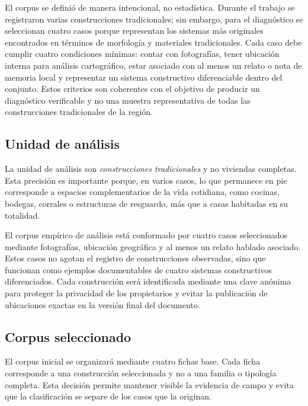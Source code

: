 El corpus se definió de manera intencional, no estadística. Durante el trabajo se registraron varias construcciones tradicionales; sin embargo, para el diagnóstico se seleccionan cuatro casos porque representan los sistemas más originales encontrados en términos de morfología y materiales tradicionales. Cada caso debe cumplir cuatro condiciones mínimas: contar con fotografías, tener ubicación interna para análisis cartográfico, estar asociado con al menos un relato o nota de memoria local y representar un sistema constructivo diferenciable dentro del conjunto. Estos criterios son coherentes con el objetivo de producir un diagnóstico verificable y no una muestra representativa de todas las construcciones tradicionales de la región.

\subsection{Unidad de análisis}

La unidad de análisis son \emph{construcciones tradicionales} y no viviendas completas. Esta precisión es importante porque, en varios casos, lo que permanece en pie corresponde a espacios complementarios de la vida cotidiana, como cocinas, bodegas, corrales o estructuras de resguardo, más que a casas habitadas en su totalidad.

El corpus empírico de análisis está conformado por cuatro casos seleccionados mediante fotografías, ubicación geográfica y al menos un relato hablado asociado. Estos casos no agotan el registro de construcciones observadas, sino que funcionan como ejemplos documentables de cuatro sistemas constructivos diferenciados. Cada construcción será identificada mediante una clave anónima para proteger la privacidad de los propietarios y evitar la publicación de ubicaciones exactas en la versión final del documento.

\subsection{Corpus seleccionado}

El corpus inicial se organizará mediante cuatro fichas base. Cada ficha corresponde a una construcción seleccionada y no a una familia o tipología completa. Esta decisión permite mantener visible la evidencia de campo y evita que la clasificación se separe de los casos que la originan.

